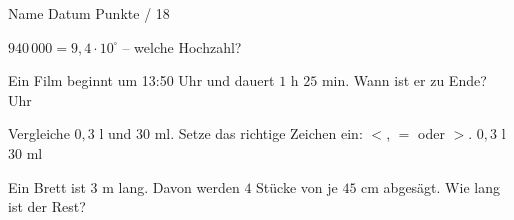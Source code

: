 \documentclass[11pt]{article}
\begin{document}
{}
\par\vspace{2pt}\noindent Name \underline{\hspace{7cm}}\hfill Datum \underline{\hspace{3cm}}\hfill Punkte \underline{\hspace{1.2cm}} / 18\par\vspace{6pt}
\small

\noindent\begin{minipage}[t]{0.485\linewidth}\raggedright
\begin{aufgabe}{$940\,000 = 9{,}4 \cdot 10^{\square}$ – welche Hochzahl? \leerfeld}
\end{aufgabe}
\end{minipage}\hfill\begin{minipage}[t]{0.485\linewidth}\raggedright
\begin{aufgabe}{Ein Film beginnt um 13:50 Uhr und dauert $1$ h $25$ min. Wann ist er zu Ende? \leerfeld Uhr}
\end{aufgabe}
\end{minipage}\par

\noindent\begin{minipage}[t]{0.485\linewidth}\raggedright
\begin{aufgabe}{Vergleiche $0{,}3$ l und $30$ ml. Setze das richtige Zeichen ein: $<$, $=$ oder $>$. $0{,}3$ l \leerfeld $30$ ml}
\end{aufgabe}
\end{minipage}\hfill\begin{minipage}[t]{0.485\linewidth}\raggedright
\begin{aufgabe}{Ein Brett ist $3$ m lang. Davon werden $4$ Stücke von je $45$ cm abgesägt. Wie lang ist der Rest? \leerfeld[cm]}
\end{aufgabe}
\end{minipage}\par
\end{document}
